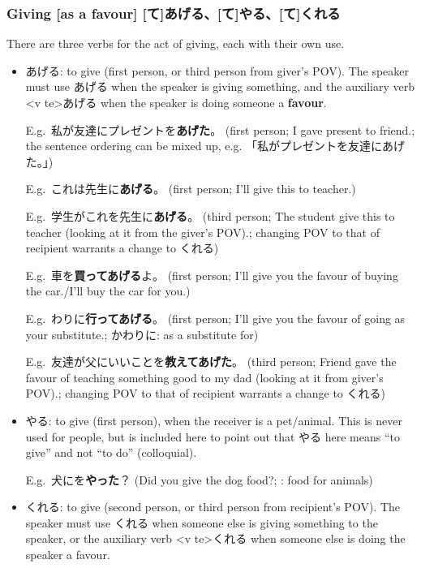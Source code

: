 \documentclass[../nihongo-gakushuu-kyouzai.tex]{subfiles}
\begin{document}
\subsubsection{Giving [as a favour] [て]あげる、[て]やる、[て]くれる} \label{sec:giving}
There are three verbs for the act of giving, each with their own use.
\begin{itemize}
    \item あげる: to give (first person, or third person from giver's POV). The speaker must use あげる when the speaker is giving something, and the auxiliary verb <v te>あげる when the speaker is doing someone a \textbf{favour}.

    E.g.\ 私が友達にプレゼントを\textbf{あげた}。 (first person; I gave present to friend.; the sentence ordering can be mixed up, e.g. 「私がプレゼントを友達にあげた。」)

    E.g.\ これは先生に\textbf{あげる}。 (first person; I'll give this to teacher.)

    E.g.\ 学生がこれを先生に\textbf{あげる}。 (third person; The student give this to teacher (looking at it from the giver's POV).; changing POV to that of recipient warrants a change to くれる)

    E.g.\ 車を\textbf{買ってあげる}よ。 (first person; I'll give you the favour of buying the car./I'll buy the car for you.)

    E.g.\ わりに\textbf{行ってあげる}。 (first person; I'll give you the favour of going as your substitute.; かわりに: as a substitute for)

    E.g.\ 友達が父にいいことを\textbf{教えてあげた}。 (third person; Friend gave the favour of teaching something good to my dad (looking at it from giver's POV).; changing POV to that of recipient warrants a change to くれる)
    \item やる: to give (first person), when the receiver is a pet/animal. This is never used for people, but is included here to point out that やる here means ``to give'' and not ``to do'' (colloquial).

    E.g.\ 犬にを\textbf{やった}？ (Did you give the dog food?; : food for animals)
    \item くれる: to give (second person, or third person from recipient's POV). The speaker must use くれる when someone else is giving something to the speaker, or the auxiliary verb <v te>くれる when someone else is doing the speaker a favour.



\end{itemize}
\end{document}
